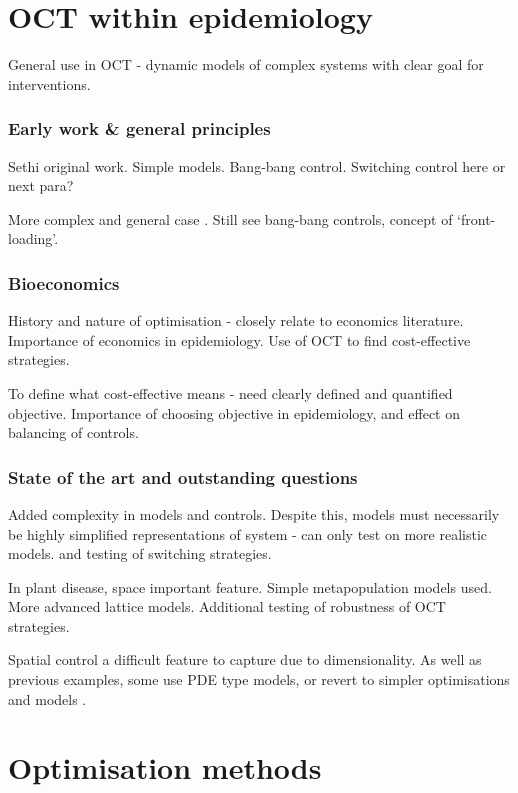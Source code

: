 \section{OCT within epidemiology}\label{sec:ch2:oct_in_epidem}

General use in OCT - dynamic models of complex systems with clear goal for interventions.

\subsubsection{Early work \& general principles}

Sethi original work. Simple models. Bang-bang control. Switching control here or next para?

More complex and general case \citep{behncke_optimal_2000}. Still see bang-bang controls, concept of `front-loading'.

\subsubsection{Bioeconomics}

History and nature of optimisation - closely relate to economics literature. Importance of economics in epidemiology. Use of OCT to find cost-effective strategies.

To define what cost-effective means - need clearly defined and quantified objective. Importance of choosing objective in epidemiology, and effect on balancing of controls.

\subsubsection{State of the art and outstanding questions}

Added complexity in models and controls. Despite this, models must necessarily be highly simplified representations of system - can only test on more realistic models. \citet{rowthorn_optimal_2009} and testing of switching strategies.

In plant disease, space important feature. Simple metapopulation models used. More advanced lattice models. Additional testing of robustness of OCT strategies.

Spatial control a difficult feature to capture due to dimensionality. As well as previous examples, some use PDE type models, or revert to simpler optimisations and models \citep{epanchin_optimal_2012}.

\section{Optimisation methods}\label{sec:ch2:optim_methods}

